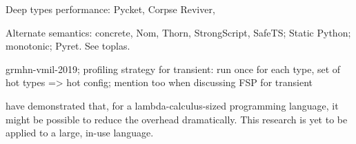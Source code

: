 

Deep types performance: Pycket, Corpse Reviver,

Alternate semantics: concrete, Nom, Thorn, StrongScript, SafeTS;
Static Python; monotonic; Pyret. See toplas.

grmhn-vmil-2019;
profiling strategy for transient: run once for each type, set of hot types => hot config;
mention too when discussing FSP for transient


{\citet{kas-pldi-2019} have demonstrated
that, for a lambda-calculus-sized programming language, it might be possible to
reduce the overhead dramatically. This research is yet to be applied to a large,
in-use language.}

